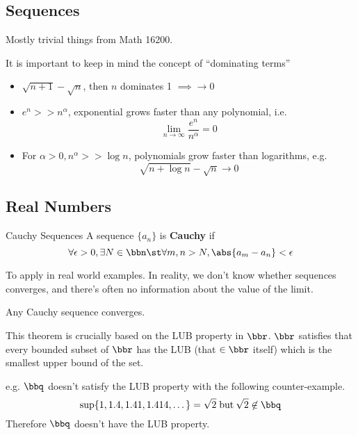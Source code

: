 
\subsection{Sequences}
Mostly trivial things from Math 16200.

It is important to keep in mind the concept of ``dominating terms''
\begin{itemize}
    \item \(\sqrt{n+1} -\sqrt{n}\), then \(n\) dominates 1 \(\implies \rightarrow 0\)
    \item \(e^n >> n^\alpha\), exponential grows faster than any polynomial, i.e. \[
              \lim_{n\to\infty} \dfrac{e^n}{n^\alpha} = 0
          \]
    \item For \(\alpha > 0, n^\alpha >> \log n\), polynomials grow faster than logarithms, e.g. \[
              \sqrt{n + \log n} - \sqrt{n} \rightarrow 0
          \]
\end{itemize}

\subsection{Real Numbers}
\begin{definition} {Cauchy Sequences}
    A sequence \(\{a_n\}\) is \textbf{Cauchy} if \[
        \forall \epsilon > 0, \exists N \in \bbn \st \forall m, n > N, \abs{a_m - a_n} < \epsilon
    \]
\end{definition}

\begin{motivation}
    To apply in real world examples. In reality, we don't know whether sequences converges, and there's often no information about the value of the limit.
\end{motivation}

\begin{theorem} 
    Any Cauchy sequence converges.
\end{theorem}

\begin{remark}
    This theorem is crucially based on the LUB property in \(\bbr\). \(\bbr\) satisfies that every bounded subset of \(\bbr\) has the LUB (that \(\in \bbr\) itself) which is the smallest upper bound of the set.

    e.g. \(\bbq\) doesn't satisfy the LUB property with the following counter-example. \[
        \sup\{1, 1.4, 1.41, 1.414, \dots\} = \sqrt{2} \;\text{but}\: \sqrt{2} \not \in \bbq
    \]
    Therefore \(\bbq\) doesn't have the LUB property.
\end{remark}

